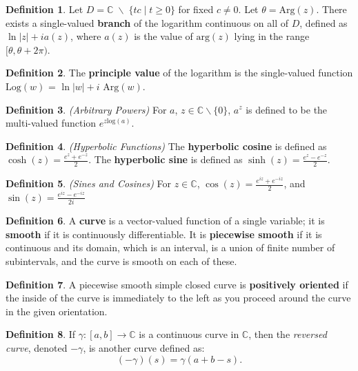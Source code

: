 \documentclass[a4paper]{article}
\theoremstyle{definition}
\newtheorem{definition}{Definition}
\begin{document}
	\begin{definition}
		Let $D = \mathbb{C} \; \backslash \; \{tc \; | \; t \geq 0\}$ for fixed $c \neq 0$. Let $\theta = \text{Arg}(z)$. There exists a single-valued \textbf{branch} of the logarithm continuous on all of $D$, defined as $\ln{|z|} + i a(z)$, where $a(z)$ is the value of $\text{arg}(z)$ lying in the range $[\theta, \theta + 2\pi)$.
	\end{definition}
	
	\begin{definition}
		The \textbf{principle value} of the logarithm is the single-valued function $\text{Log}(w)$ = $\ln|w| + i$ $\text{Arg}(w)$.
	\end{definition}
	
	\begin{definition}
		\emph{(Arbitrary Powers)}
		For $a$, $z \in \mathbb{C} \backslash \{0\}$, $a^{z}$ is defined to be the multi-valued function $e^{z \text{log}(a)}$.
	\end{definition}
	
	\begin{definition}
		\emph{(Hyperbolic Functions)}
		The \textbf{hyperbolic cosine} is defined as $\cosh{(z)} = \frac{e^{z} + e^{-z} }{2}$. The \textbf{hyperbolic sine} is defined as $\sinh{(z)} = \frac{e^{z} - e^{-z} }{2}$.
	\end{definition}
	
	\begin{definition}
		\emph{(Sines and Cosines)}
		For $z \in \mathbb{C}$, $\cos{(z)} = \frac{e^{i z} + e^{-i z} }{2}$, and $\sin{(z)} = \frac{e^{i z} - e^{-i z} }{2 i}$
	\end{definition}
	
	\begin{definition}
		A \textbf{curve} is a vector-valued function of a single variable; it is \textbf{smooth} if it is continuously differentiable. It is \textbf{piecewise smooth} if it is continuous and its domain, which is an interval, is a union of finite number of subintervals, and the curve is smooth on each of these.
	\end{definition}
	
	\begin{definition}
		A piecewise smooth simple closed curve is \textbf{positively oriented} if the inside of the curve is immediately to the left as you proceed around the curve in the given orientation.
	\end{definition}
	
	\begin{definition}
		If $\gamma : [a,b] \rightarrow \mathbb{C}$ is a continuous curve in $\mathbb{C}$, then the \textit{reversed curve}, denoted $-\gamma$, is another curve defined as:
		$$(-\gamma)(s) = \gamma(a + b - s).$$
	\end{definition}
	
\end{document}
